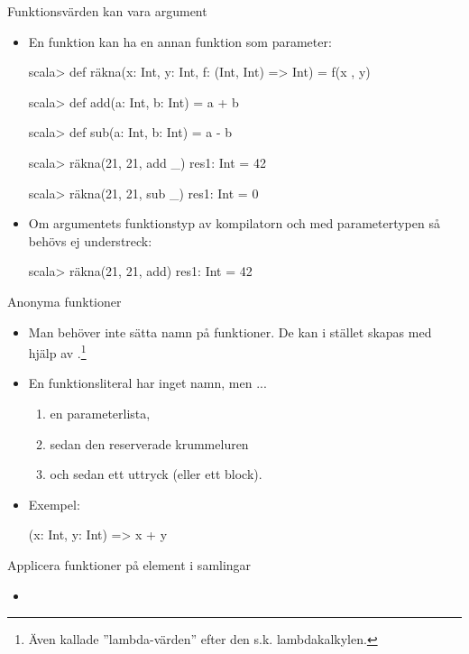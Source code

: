 \begin{Slide}{Funktionsvärden kan vara argument}
\begin{itemize}
\item En funktion kan ha en annan funktion som parameter:
\begin{REPL}
scala> def räkna(x: Int, y: Int, f: (Int, Int) => Int) = f(x , y)

scala> def add(a: Int, b: Int) = a + b

scala> def sub(a: Int, b: Int) = a - b

scala> räkna(21, 21, add _)
res1: Int = 42

scala> räkna(21, 21, sub _)
res1: Int = 0
\end{REPL}

\item Om argumentets funktionstyp  av kompilatorn och  med parametertypen så behövs ej understreck: \\ 
\begin{REPL}
scala> räkna(21, 21, add)
res1: Int = 42
\end{REPL}\end{itemize}
\end{Slide}


\begin{Slide}{Anonyma funktioner}
\begin{itemize}
\item  Man behöver inte sätta namn på funktioner. De kan i stället skapas med hjälp av .\footnote{Även kallade ''lambda-värden'' efter den s.k. lambdakalkylen.}

\item En funktionsliteral har inget namn, men ...
\begin{enumerate}
\item en parameterlista, \item sedan den reserverade krummeluren \code{=>} \item och sedan ett uttryck (eller ett block).
\end{enumerate}
\item Exempel:
\begin{Code}[basicstyle=\ttfamily\fontsize{10}{12}\selectfont]
(x: Int, y: Int) => x + y
\end{Code}
\end{itemize}
\end{Slide}




\begin{Slide}{Applicera funktioner på element i samlingar}
\begin{itemize}
\item 
\end{itemize}
\end{Slide} 




